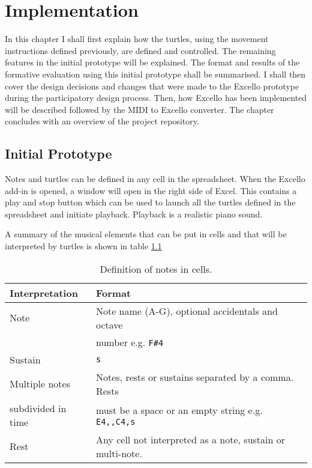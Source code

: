 \chapter{Implementation}

In this chapter I shall first explain how the turtles, using the movement instructions defined previously, are defined and controlled. The remaining features in the initial prototype will be explained. The format and results of the formative evaluation using this initial prototype shall be summarised. I shall then cover the design decisions and changes that were made to the Excello prototype during the participatory design process. Then, how Excello has been implemented will be described followed by the MIDI to Excello converter. The chapter concludes with an overview of the project repository.

\section{Initial Prototype}

Notes and turtles can be defined in any cell in the spreadsheet. When the Excello add-in is opened, a window will open in the right side of Excel. This contains a play and stop button which can be used to launch all the turtles defined in the spreadsheet and initiate playback. Playback is a realistic piano sound.

A summary of the musical elements that can be put in cells and that will be interpreted by turtles is shown in table \ref{tab:cells}

\begin{table}
\centering
\caption{Definition of notes in cells.}
\begin{tabular}{|l|l|} \hline
\textbf{Interpretation}&\textbf{Format}\\ \hline
Note& Note name (A-G), optional accidentals and octave \\
&number e.g. \texttt{F\#4}\\ \hline
Sustain& \texttt{s}\\ \hline
Multiple notes& Notes, rests or sustains separated by a comma. Rests \\
subdivided in time& must be a space or an empty string e.g. \texttt{E4,,C4,s}\\ \hline
Rest& Any cell not interpreted as a note, sustain or multi-note. \\ \hline
\end{tabular}
\label{tab:cells}
\end{table}


